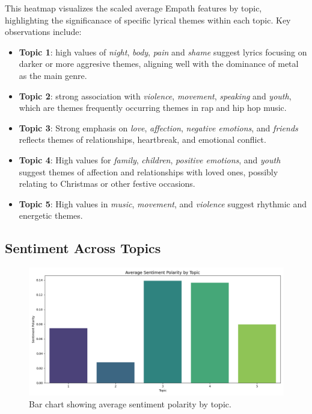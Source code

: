 This heatmap visualizes the scaled average Empath features by topic,
highlighting the significanace of specific lyrical themes within each topic.
Key observations include:

\begin{itemize}
  \item \textbf{Topic 1}: high values of \textit{night}, \textit{body},
    \textit{pain} and \textit{shame} suggest lyrics focusing on darker or more
    aggresive themes,  aligning well with the dominance of metal as the main
    genre.
  \item \textbf{Topic 2}: strong association with \textit{violence},
    \textit{movement}, \textit{speaking} and \textit{youth}, which are themes
    frequently occurring themes in rap and hip hop music.
  \item \textbf{Topic 3}: Strong emphasis on \textit{love}, \textit{affection},
    \textit{negative emotions}, and \textit{friends} reflects themes of
    relationships, heartbreak, and emotional conflict.
  \item \textbf{Topic 4}: High values for \textit{family}, \textit{children},
    \textit{positive emotions}, and \textit{youth} suggest themes of affection
    and relationships with loved ones, possibly relating to Christmas or other
    festive occasions.
  \item \textbf{Topic 5}: High values in \textit{music}, \textit{movement}, and
    \textit{violence} suggest rhythmic and energetic themes.
\end{itemize}

\subsection{Sentiment Across Topics}
\begin{center}
\begin{figure}[H]
  \centering
  \includegraphics[width=5in]{img/lda_sentiment.png}
  \caption{Bar chart showing average sentiment polarity by topic.}
  \label{Figure:fig_eh}
\end{figure}
\end{center}

